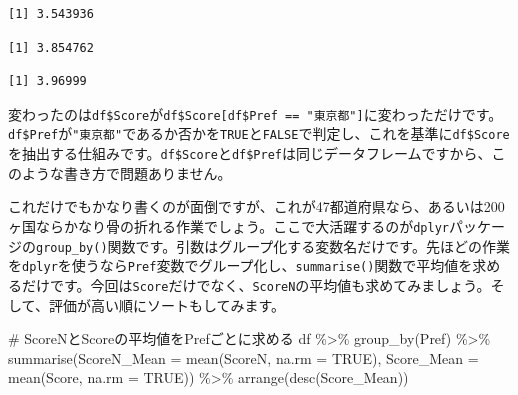 \documentclass[
  a4paper,
  pandoc,
  ja=standard,
  jafont=haranoaji]{bxjsbook}
\newenvironment{Shaded}{\begin{snugshade}}{\end{snugshade}}
\newcommand{\AttributeTok}[1]{\textcolor[rgb]{0.00,0.48,0.65}{#1}}
\newcommand{\CommentTok}[1]{\textcolor[rgb]{0.37,0.37,0.37}{#1}}
\newcommand{\ConstantTok}[1]{\textcolor[rgb]{0.56,0.35,0.01}{#1}}
\newcommand{\FunctionTok}[1]{\textcolor[rgb]{0.28,0.35,0.67}{#1}}
\newcommand{\NormalTok}[1]{\textcolor[rgb]{0.00,0.48,0.65}{#1}}
\newcommand{\SpecialCharTok}[1]{\textcolor[rgb]{0.37,0.37,0.37}{#1}}
\newcommand{\StringTok}[1]{\textcolor[rgb]{0.13,0.47,0.30}{#1}}
\begin{document}
\begin{verbatim}
[1] 3.543936
\end{verbatim}

\begin{Shaded}
\end{Shaded}

\begin{verbatim}
[1] 3.854762
\end{verbatim}

\begin{Shaded}
\end{Shaded}

\begin{verbatim}
[1] 3.96999
\end{verbatim}

変わったのは\texttt{df\$Score}が\texttt{df\$Score{[}df\$Pref\ ==\ "東京都"{]}}に変わっただけです。\texttt{df\$Pref}が\texttt{"東京都"}であるか否かを\texttt{TRUE}と\texttt{FALSE}で判定し、これを基準に\texttt{df\$Score}を抽出する仕組みです。\texttt{df\$Score}と\texttt{df\$Pref}は同じデータフレームですから、このような書き方で問題ありません。

これだけでもかなり書くのが面倒ですが、これが47都道府県なら、あるいは200ヶ国ならかなり骨の折れる作業でしょう。ここで大活躍するのが\texttt{dplyr}パッケージの\texttt{group\_by()}関数です。引数はグループ化する変数名だけです。先ほどの作業を\texttt{dplyr}を使うなら\texttt{Pref}変数でグループ化し、\texttt{summarise()}関数で平均値を求めるだけです。今回は\texttt{Score}だけでなく、\texttt{ScoreN}の平均値も求めてみましょう。そして、評価が高い順にソートもしてみます。

\begin{Shaded}
\begin{Highlighting}[numbers=left,,]
\CommentTok{\# ScoreNとScoreの平均値をPrefごとに求める}
\NormalTok{df }\SpecialCharTok{\%\textgreater{}\%}
  \FunctionTok{group\_by}\NormalTok{(Pref) }\SpecialCharTok{\%\textgreater{}\%}
  \FunctionTok{summarise}\NormalTok{(}\AttributeTok{ScoreN\_Mean =} \FunctionTok{mean}\NormalTok{(ScoreN, }\AttributeTok{na.rm =} \ConstantTok{TRUE}\NormalTok{),}
            \AttributeTok{Score\_Mean  =} \FunctionTok{mean}\NormalTok{(Score,  }\AttributeTok{na.rm =} \ConstantTok{TRUE}\NormalTok{)) }\SpecialCharTok{\%\textgreater{}\%}
  \FunctionTok{arrange}\NormalTok{(}\FunctionTok{desc}\NormalTok{(Score\_Mean))}
\end{Highlighting}
\end{Shaded}
\end{document}
